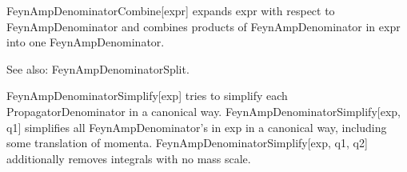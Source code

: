









FeynAmpDenominatorCombine[expr] expands expr with respect to FeynAmpDenominator and combines products of FeynAmpDenominator in expr into
  one FeynAmpDenominator.

See also:  FeynAmpDenominatorSplit.










FeynAmpDenominatorSimplify[exp] tries to simplify each PropagatorDenominator in a canonical way. FeynAmpDenominatorSimplify[exp, q1]
  simplifies all FeynAmpDenominator's in exp in a canonical way, including some translation of momenta. FeynAmpDenominatorSimplify[exp,
  q1, q2] additionally removes integrals with no mass scale.


